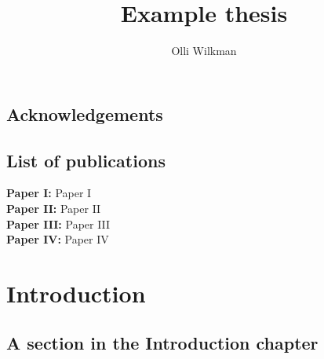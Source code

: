 \documentclass[b5paper,11pt,english,twoside]{report}
\title{Example thesis}
\author{Olli Wilkman}
\begin{document}
\frontmatter

\maketitle

\begin{abstract}
	\lipsum[1-4]
\end{abstract}


\section{Acknowledgements}
	\lipsum[3]


\section{List of publications}

\textbf{Paper I:} Paper I \\
\newline
\textbf{Paper II:} Paper II \\
\newline
\textbf{Paper III:} Paper III \\
\newline
\textbf{Paper IV:} Paper IV



\tableofcontents


\cleardoublepage\mainmatter

\chapter{Introduction}

\section{A section in the Introduction chapter}

\lipsum[1-8]
\end{document}

